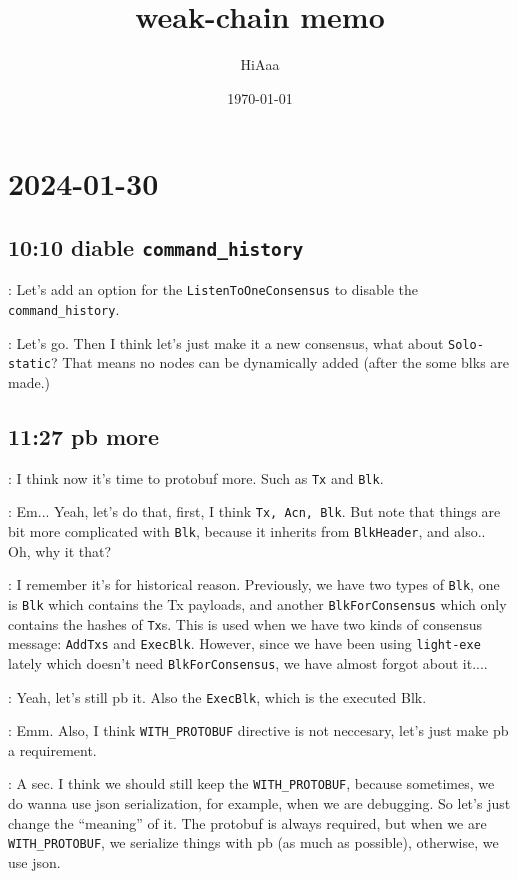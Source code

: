 \documentclass[dvipsnames]{article}
\title{weak-chain memo}
\date{\today}
\author{HiAaa}
\begin{document}
\maketitle
\tableofcontents{}
\newpage{}


\section*{2024-01-30}

\subsection*{10:10 diable \texttt{command\_history} \cola{[done at 11:26]}}

 : Let's add an option for the \texttt{ListenToOneConsensus} to
disable the \texttt{command\_history}.

 : Let's go. Then I think let's just make it a new consensus, what
about \texttt{Solo-static}? That means no nodes can be dynamically added (after
the some blks are made.)

\subsection*{11:27 pb more}

 : I think now it's time to protobuf more. Such as \texttt{Tx} and
\texttt{Blk}.

 : Em... Yeah, let's do that, first, I think \texttt{Tx, Acn,
  Blk}. But note that things are bit more complicated with \texttt{Blk}, because
it inherits from \texttt{BlkHeader}, and also.. Oh, why it that?

 : I remember it's for historical reason. Previously, we have two
types of \texttt{Blk}, one is \texttt{Blk} which contains the Tx payloads, and
another \texttt{BlkForConsensus} which only contains the hashes of \texttt{Tx}s.
This is used when we have two kinds of consensus message: \texttt{AddTxs} and
\texttt{ExecBlk}. However, since we have been using \texttt{light-exe} lately
which doesn't need \texttt{BlkForConsensus}, we have almost forgot about it....

 : Yeah, let's still pb it. Also the \texttt{ExecBlk}, which is
the executed Blk.

 : Emm. Also, I think \texttt{WITH\_PROTOBUF} directive is not
neccesary, let's just make pb a requirement.

 : A sec. I think we should still keep the
\texttt{WITH\_PROTOBUF}, because sometimes, we do wanna use json serialization,
for example, when we are debugging. So let's just change the ``meaning'' of it.
The protobuf is always required, but when we are \texttt{WITH\_PROTOBUF}, we
serialize things with pb (as much as possible), otherwise, we use json.
\end{document}
